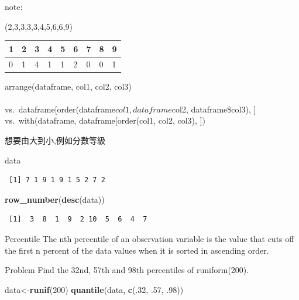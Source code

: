 \documentclass[]{book}
\newenvironment{Shaded}{\begin{snugshade}}{\end{snugshade}}
\newcommand{\DecValTok}[1]{\textcolor[rgb]{0.00,0.00,0.81}{#1}}
\newcommand{\FloatTok}[1]{\textcolor[rgb]{0.00,0.00,0.81}{#1}}
\newcommand{\KeywordTok}[1]{\textcolor[rgb]{0.13,0.29,0.53}{\textbf{#1}}}
\newcommand{\NormalTok}[1]{#1}
\theoremstyle{definition}
\theoremstyle{definition}
\theoremstyle{definition}
\theoremstyle{remark}
\begin{document}
note:

(2,3,3,3,3,4,5,6,6,9)

\begin{longtable}[]{@{}lllllllll@{}}
\toprule
1 & 2 & 3 & 4 & 5 & 6 & 7 & 8 & 9\tabularnewline
\midrule
\endhead
0 & 1 & 4 & 1 & 1 & 2 & 0 & 0 & 1\tabularnewline
\bottomrule
\end{longtable}

arrange(dataframe, col1, col2, col3)\\
~\\
vs.~dataframe{[}order(dataframe\(col1, dataframe\)col2,
dataframe\$col3), {]}\\
vs.~with(dataframe, dataframe{[}order(col1, col2, col3), {]})

想要由大到小,例如分數等級

\begin{Shaded}
\begin{Highlighting}[]
\NormalTok{data}
\end{Highlighting}
\end{Shaded}

\begin{verbatim}
 [1] 7 1 9 1 9 1 5 2 7 2
\end{verbatim}

\begin{Shaded}
\begin{Highlighting}[]
\KeywordTok{row_number}\NormalTok{(}\KeywordTok{desc}\NormalTok{(data))}
\end{Highlighting}
\end{Shaded}

\begin{verbatim}
 [1]  3  8  1  9  2 10  5  6  4  7
\end{verbatim}

Percentile The nth percentile of an observation variable is the value
that cuts off the first n percent of the data values when it is sorted
in ascending order.

Problem Find the 32nd, 57th and 98th percentiles of runiform(200).

\begin{Shaded}
\begin{Highlighting}[]
\NormalTok{data<-}\KeywordTok{runif}\NormalTok{(}\DecValTok{200}\NormalTok{) }
\KeywordTok{quantile}\NormalTok{(data, }\KeywordTok{c}\NormalTok{(.}\DecValTok{32}\NormalTok{, }\FloatTok{.57}\NormalTok{, }\FloatTok{.98}\NormalTok{)) }
\end{Highlighting}
\end{Shaded}
\end{document}
